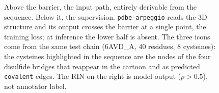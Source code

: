 \begin{figure}[tb]
{}
  \caption{Above the barrier, the input path, entirely derivable from the
  sequence. Below it, the supervision. \texttt{pdbe-arpeggio} reads the 3D
  structure and its output crosses the barrier at a single point, the training
  loss; at inference the lower half is absent. The three icons come from the same
  test chain (6AVD\_A, 40 residues, 8 cysteines): the cysteines highlighted in the
  sequence are the nodes of the four disulfide bridges that reappear in the
  cartoon and as predicted \texttt{covalent} edges. The RIN on the right is model
  output ($p>0.5$), not annotator label.}
  \label{fig:pipeline}
\end{figure}